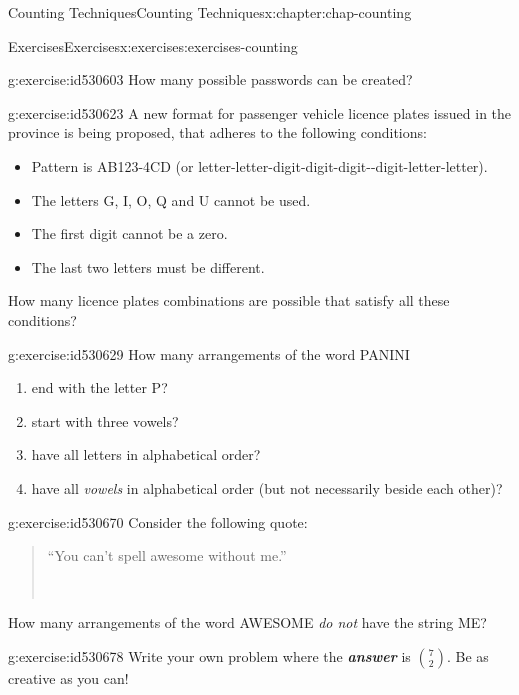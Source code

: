 \documentclass[oneside,10pt,]{book}
\newcommand{\alert}[1]{\textbf{\textit{#1}}}
\numberwithin{equation}{section}
\begin{document}
\begin{chapterptx}{Counting Techniques}{}{Counting Techniques}{}{}{x:chapter:chap-counting}
\begin{exercises-section}{Exercises}{}{Exercises}{}{}{x:exercises:exercises-counting}
\begin{divisionexercise}{2}{}{}{g:exercise:id530603}
How many possible passwords can be created?%
\end{divisionexercise}%
\begin{divisionexercise}{3}{}{}{g:exercise:id530623}%
A new format for passenger vehicle licence plates issued in the province is being proposed, that adheres to the following conditions:%
\begin{itemize}[label=\textbullet]
\item{}Pattern is AB123-4CD (or letter-letter-digit-digit-digit-{}-{}digit-letter-letter).%
\item{}The letters G, I, O, Q and U cannot be used.%
\item{}The first digit cannot be a zero.%
\item{}The last two letters must be different.%
\end{itemize}
How many licence plates combinations are possible that satisfy all these conditions?%
\end{divisionexercise}%
\begin{divisionexercise}{4}{}{}{g:exercise:id530629}%
How many arrangements of the word PANINI%
\begin{enumerate}[label=(\alph*)]
\item{}end with the letter P?%
\item{}start with three vowels?%
\item{}have all letters in alphabetical order?%
\item{}have all \emph{vowels} in alphabetical order (but not necessarily beside each other)?%
\end{enumerate}
%
\end{divisionexercise}%
\begin{divisionexercise}{5}{}{}{g:exercise:id530670}%
Consider the following quote:%
\begin{quote}%
``You can't spell awesome without me.''%
\nopagebreak\par%
\hfill{}\\\par
\end{quote}
How many arrangements of the word AWESOME \emph{do not} have the string ME?%
\end{divisionexercise}%
\begin{divisionexercise}{6}{}{}{g:exercise:id530678}%
Write your own problem where the \alert{answer} is \(\displaystyle\binom{7}{2}\). Be as creative as you can!%

\end{divisionexercise}
\end{exercises-section}
\end{chapterptx}
\end{document}
